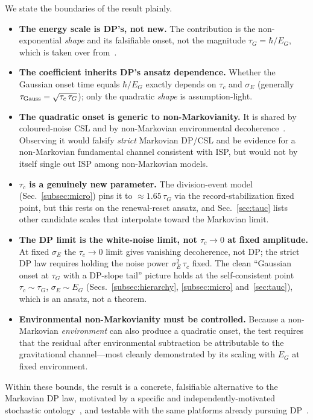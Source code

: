 \documentclass[aps,prd,onecolumn,amsmath,amssymb,nofootinbib,superscriptaddress]{revtex4-2}
\begin{document}
We state the boundaries of the result plainly.
\begin{itemize}
\item \textbf{The energy scale is DP's, not new.} The contribution is the non-exponential
\emph{shape} and its falsifiable onset, not the magnitude $\tau_G=\hbar/E_G$, which is taken over
from~\cite{R1,R2,R3}.
\item \textbf{The coefficient inherits DP's ansatz dependence.} Whether the Gaussian onset time
equals $\hbar/E_G$ exactly depends on $\tau_c$ and $\sigma_E$ (generally $\tau_{\rm
Gauss}=\sqrt{\tau_c\,\tau_G}$); only the quadratic \emph{shape} is assumption-light.
\item \textbf{The quadratic onset is generic to non-Markovianity.} It is shared by coloured-noise CSL
and by non-Markovian environmental decoherence~\cite{R10,R21,R22}. Observing it would falsify
\emph{strict} Markovian DP/CSL and be evidence for a non-Markovian fundamental channel consistent
with ISP, but would not by itself single out ISP among non-Markovian models.
\item \textbf{$\tau_c$ is a genuinely new parameter.} The division-event model
(Sec.~\ref{subsec:micro}) pins it to $\approx1.65\,\tau_G$ via the record-stabilization fixed point, but
this rests on the renewal-reset ansatz, and Sec.~\ref{sec:tauc} lists other candidate scales that
interpolate toward the Markovian limit.
\item \textbf{The DP limit is the white-noise limit, not $\tau_c\to0$ at fixed amplitude.} At fixed
$\sigma_E$ the $\tau_c\to0$ limit gives vanishing decoherence, not DP; the strict DP law requires
holding the noise power $\sigma_E^2\,\tau_c$ fixed. The clean ``Gaussian onset at $\tau_G$ with a
DP-slope tail'' picture holds at the self-consistent point $\tau_c\sim\tau_G$, $\sigma_E\sim E_G$
(Secs.~\ref{subsec:hierarchy}, \ref{subsec:micro} and~\ref{sec:tauc}), which is an ansatz, not a theorem.
\item \textbf{Environmental non-Markovianity must be controlled.} Because a non-Markovian
\emph{environment} can also produce a quadratic onset, the test requires that the residual after
environmental subtraction be attributable to the gravitational channel---most cleanly demonstrated by
its scaling with $E_G$ at fixed environment.
\end{itemize}
Within these bounds, the result is a concrete, falsifiable alternative to the Markovian DP law,
motivated by a specific and independently-motivated stochastic ontology~\cite{R11,R12}, and testable
with the same platforms already pursuing DP~\cite{R16,R17,R19,R23}.
\end{document}
